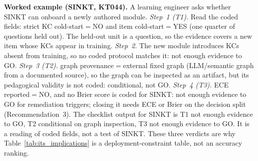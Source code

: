 \documentclass[lettersize,journal]{IEEEtran}
\begin{document}
\textbf{Worked example (SINKT, KT044).} A learning engineer asks whether SINKT can onboard a newly authored module. \emph{Step~1 (T1).} Read the coded fields: strict KC cold-start$=$NO and item cold-start$=$YES (one quarter of questions held out). The held-out unit is a question, so the evidence covers a new item whose KCs appear in training. \emph{Step~2.} The new module introduces KCs absent from training, so no coded protocol matches it: not enough evidence to GO. \emph{Step~3 (T2).} graph provenance$=$external fixed graph (LLM/semantic graph from a documented source), so the graph can be inspected as an artifact, but its pedagogical validity is not coded: conditional, not GO. \emph{Step~4 (T3).} ECE reported$=$NO, and no Brier score is coded for SINKT: not enough evidence to GO for remediation triggers; closing it needs ECE or Brier on the decision split (Recommendation~3). The checklist output for SINKT is T1 not enough evidence to GO, T2 conditional on graph inspection, T3 not enough evidence to GO. It is a reading of coded fields, not a test of SINKT.
These three verdicts are why Table~\ref{tab:its_implications} is a deployment-constraint table, not an accuracy ranking.
\end{document}
